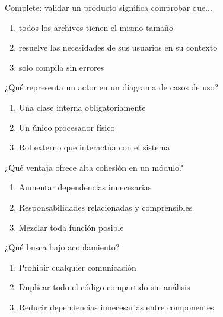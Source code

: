 \noindent\begin{minipage}{\linewidth}\setlength{\parskip}{4pt}\label{q:S-004}
Complete: validar un producto significa comprobar que...
\begin{enumerate}[label=\Alph*),nosep]
\item todos los archivos tienen el mismo tamaño
\item resuelve las necesidades de sus usuarios en su contexto
\item solo compila sin errores
\end{enumerate}\end{minipage}\par\medskip

\noindent\begin{minipage}{\linewidth}\setlength{\parskip}{4pt}\label{q:S-005}
¿Qué representa un actor en un diagrama de casos de uso?
\begin{enumerate}[label=\Alph*),nosep]
\item Una clase interna obligatoriamente
\item Un único procesador físico
\item Rol externo que interactúa con el sistema
\end{enumerate}\end{minipage}\par\medskip

\noindent\begin{minipage}{\linewidth}\setlength{\parskip}{4pt}\label{q:S-006}
¿Qué ventaja ofrece alta cohesión en un módulo?
\begin{enumerate}[label=\Alph*),nosep]
\item Aumentar dependencias innecesarias
\item Responsabilidades relacionadas y comprensibles
\item Mezclar toda función posible
\end{enumerate}\end{minipage}\par\medskip

\noindent\begin{minipage}{\linewidth}\setlength{\parskip}{4pt}\label{q:S-007}
¿Qué busca bajo acoplamiento?
\begin{enumerate}[label=\Alph*),nosep]
\item Prohibir cualquier comunicación
\item Duplicar todo el código compartido sin análisis
\item Reducir dependencias innecesarias entre componentes
\end{enumerate}\end{minipage}\par\medskip

